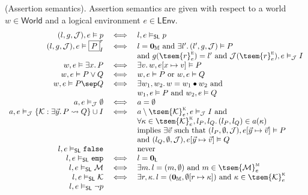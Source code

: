  (Assertion semantics). Assertion semantics are given with respect to a world $w \in \mathsf{World}$ and a logical environment $e \in \mathsf{LEnv}$.
\begingroup
\renewcommand*{\arraystretch}{1.5}
\[
\begin{array}{r c l}
	(l, g, \mathcal{J}), e \vDash p
	&
	\iff
	&
	l, e \vDash_\mathsf{SL} p
\\
	(l, g, \mathcal{J}), e \vDash \boxed{P}_I^r
	&
	\iff
	&
	l = \mathbf{0}_\mathbb{M} \text{ and } \exists l' \ldotp (l', g, \mathcal{J}) \vDash P
	\\ && \text{and } g(\tsem{r}_e^\textsc{e}) = l' \text{ and } \mathcal{J}(\tsem{r}_e^\textsc{e}), e \vDash_\mathcal{J} I
\\
	w, e \vDash \exists x \ldotp P
	&
	\iff
	&
	\exists v \ldotp w, e[x \mapsto v] \vDash P
\\
	w, e \vDash P \lor Q
	&
	\iff
	&
	w, e \vDash P \text{ or } w, e \vDash Q
\\
	w, e \vDash P \sep Q
	&
	\iff
	&
	\exists w_1, w_2 \ldotp w = w_1 \bullet w_2 \text{ and } \\ && w_1, e \vDash P \text{ and } w_2, e \vDash Q
\\
	a, e \vDash_\mathcal{J} \emptyset
	&
	\iff	
	&
	a = \emptyset
\\
	a, e \vDash_\mathcal{J} \{ \mathcal{K} : \exists \vec{y} \ldotp P \leadsto Q \} \cup I
	&
	\iff
	&
	a \setminus \tsem{\mathcal{K}}_e^\textsc{k}, e \vDash_\mathcal{J} I \text{ and } \\ && \forall \kappa \in \tsem{\mathcal{K}}_e^\textsc{k}, l_P, l_Q \ldotp (l_P, l_Q) \in a(\kappa) \\ && \text{implies } \exists \vec{v} \text{ such that } (l_P, \emptyset, \mathcal{J}), e[\vec{y} \mapsto \vec{v}] \vDash P \\ && \text{and } (l_Q, \emptyset, \mathcal{J}), e[\vec{y} \mapsto \vec{v}] \vDash Q
\\
	l, e \vDash_\mathsf{SL} \mathtt{false}
	&&
	\text{never}
\\
	l, e \vDash_\mathsf{SL}  \mathtt{emp}
	&
	\iff
	&
	l = \mathbf{0}_\mathsf{L}
\\
	l, e \vDash_\mathsf{SL} \mathcal{M}
	&
	\iff
	&
	\exists m \ldotp l = (m, \emptyset) \text{ and } m \in \tsem{\mathcal{M}}_e^\textsc{m}
\\
	l, e \vDash_\mathsf{SL} \mathcal{K}
	&
	\iff
	&
	\exists r, \kappa \ldotp l = (\mathbf{0}_\mathbb{M}, \emptyset[r \mapsto \kappa]) \text{ and } \kappa \in \tsem{\mathcal{K}}_e^\textsc{k}
\\
	l, e \vDash_\mathsf{SL} \lnot p

\end{array}\]

